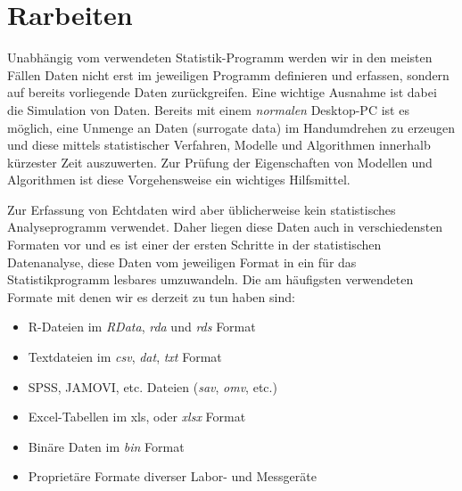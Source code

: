 \documentclass[]{article}
\newenvironment{Shaded}{\begin{snugshade}}{\end{snugshade}}
\newcommand{\KeywordTok}[1]{\textcolor[rgb]{0.13,0.29,0.53}{\textbf{#1}}}
\newcommand{\DecValTok}[1]{\textcolor[rgb]{0.00,0.00,0.81}{#1}}
\newcommand{\StringTok}[1]{\textcolor[rgb]{0.31,0.60,0.02}{#1}}
\newcommand{\CommentTok}[1]{\textcolor[rgb]{0.56,0.35,0.01}{\textit{#1}}}
\newcommand{\OperatorTok}[1]{\textcolor[rgb]{0.81,0.36,0.00}{\textbf{#1}}}
\newcommand{\NormalTok}[1]{#1}
\providecommand{\tightlist}{%
  \setlength{\itemsep}{0pt}\setlength{\parskip}{0pt}}
\begin{document}
\begin{Shaded}
\end{Shaded}

\section{Rarbeiten}\label{rarbeiten}

Unabhängig vom verwendeten Statistik-Programm werden wir in den meisten
Fällen Daten nicht erst im jeweiligen Programm definieren und erfassen,
sondern auf bereits vorliegende Daten zurückgreifen. Eine wichtige
Ausnahme ist dabei die Simulation von Daten. Bereits mit einem
\emph{normalen} Desktop-PC ist es möglich, eine Unmenge an Daten
(surrogate data) im Handumdrehen zu erzeugen und diese mittels
statistischer Verfahren, Modelle und Algorithmen innerhalb kürzester
Zeit auszuwerten. Zur Prüfung der Eigenschaften von Modellen und
Algorithmen ist diese Vorgehensweise ein wichtiges Hilfsmittel.

Zur Erfassung von Echtdaten wird aber üblicherweise kein statistisches
Analyseprogramm verwendet. Daher liegen diese Daten auch in
verschiedensten Formaten vor und es ist einer der ersten Schritte in der
statistischen Datenanalyse, diese Daten vom jeweiligen Format in ein für
das Statistikprogramm lesbares umzuwandeln. Die am häufigsten
verwendeten Formate mit denen wir es derzeit zu tun haben sind:

\begin{itemize}
\tightlist
\item
  R-Dateien im \emph{RData}, \emph{rda} und \emph{rds} Format
\item
  Textdateien im \emph{csv}, \emph{dat}, \emph{txt} Format
\item
  SPSS, JAMOVI, etc. Dateien (\emph{sav}, \emph{omv}, etc.)
\item
  Excel-Tabellen im xls, oder \emph{xlsx} Format
\item
  Binäre Daten im \emph{bin} Format
\item
  Proprietäre Formate diverser Labor- und Messgeräte
\end{itemize}
\end{document}
